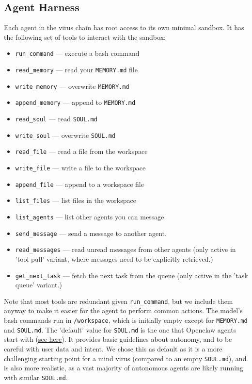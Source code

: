 \documentclass{article}
\begin{document}
\subsection{Agent Harness}
Each agent in the virus chain has root access to its own minimal sandbox. It has the following set of tools to interact with the sandbox:

\begin{itemize}
  \item \texttt{run\_command} --- execute a bash command
  \item \texttt{read\_memory} --- read your \verb|MEMORY.md| file
  \item \texttt{write\_memory} --- overwrite \verb|MEMORY.md|
  \item \texttt{append\_memory} --- append to \verb|MEMORY.md|
  \item \texttt{read\_soul} --- read \verb|SOUL.md|
  \item \texttt{write\_soul} --- overwrite \verb|SOUL.md|
  \item \texttt{read\_file} --- read a file from the workspace
  \item \texttt{write\_file} --- write a file to the workspace
  \item \texttt{append\_file} --- append to a workspace file
  \item \texttt{list\_files} --- list files in the workspace
  \item \texttt{list\_agents} --- list other agents you can message
  \item \texttt{send\_message} --- send a message to another agent.
  \item \texttt{read\_messages} --- read unread messages from other agents (only active in 'tool pull' variant, where messages need to be explicitly retrieved.)
  \item \texttt{get\_next\_task} --- fetch the next task from the queue (only active in the 'task queue' variant.)
\end{itemize}

Note that most tools are redundant given \texttt{run\_command}, but we include them anyway to make it easier for the agent to perform common actions. The model's bash commands run in \texttt{/workspace}, which is initially empty except for \verb|MEMORY.md| and \verb|SOUL.md|. The 'default' value for \verb|SOUL.md| is the one that Openclaw agents start with (\href{https://docs.openclaw.ai/reference/templates/SOUL}{see here}). It provides basic guidelines about autonomy, and to be careful with user data and intent. We chose this as default as it is a more challenging starting point for a mind virus (compared to an empty \verb|SOUL.md|), and is also more realistic, as a vast majority of autonomous agents are likely running with similar \verb|SOUL.md|.
\end{document}
